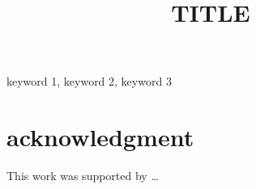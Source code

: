 \documentclass[a4paper,conference]{IEEEtran}
\begin{document}
\title{TITLE}

\author{


}

\maketitle

\begin{abstract}
%
\end{abstract}

\renewcommand\IEEEkeywordsname{Keywords}
\begin{IEEEkeywords}
keyword 1, keyword 2, keyword 3
\end{IEEEkeywords}

%
%

\section*{acknowledgment}
This work was supported by \ldots



%
\end{document}
